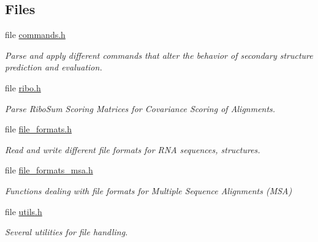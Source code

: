 \subsection*{Files}
\begin{DoxyCompactItemize}
\item 
file \hyperlink{commands_8h}{commands.\+h}
\begin{DoxyCompactList}\small\item\em Parse and apply different commands that alter the behavior of secondary structure prediction and evaluation. \end{DoxyCompactList}\item 
file \hyperlink{ribo_8h}{ribo.\+h}
\begin{DoxyCompactList}\small\item\em Parse Ribo\+Sum Scoring Matrices for Covariance Scoring of Alignments. \end{DoxyCompactList}\item 
file \hyperlink{io_2file__formats_8h}{file\+\_\+formats.\+h}
\begin{DoxyCompactList}\small\item\em Read and write different file formats for R\+NA sequences, structures. \end{DoxyCompactList}\item 
file \hyperlink{io_2file__formats__msa_8h}{file\+\_\+formats\+\_\+msa.\+h}
\begin{DoxyCompactList}\small\item\em Functions dealing with file formats for Multiple Sequence Alignments (M\+SA) \end{DoxyCompactList}\item 
file \hyperlink{io_2utils_8h}{utils.\+h}
\begin{DoxyCompactList}\small\item\em Several utilities for file handling. \end{DoxyCompactList}\end{DoxyCompactItemize}
